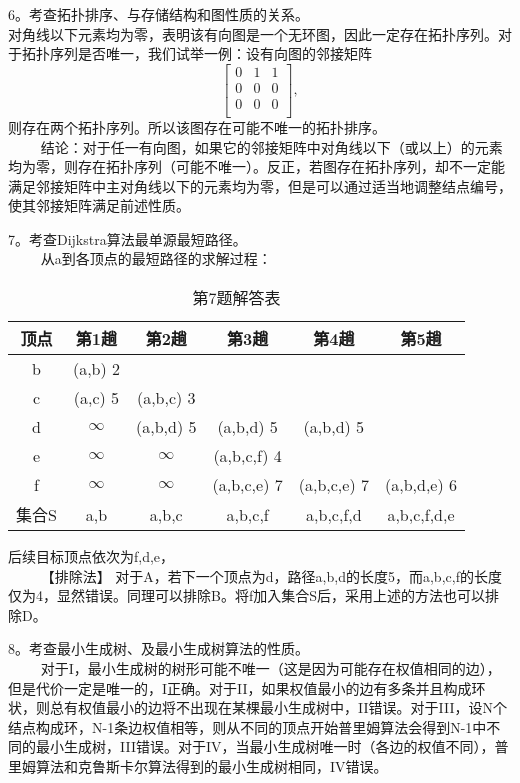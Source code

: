 6。考查拓扑排序、与存储结构和图性质的关系。\\
对角线以下元素均为零，表明该有向图是一个无环图，因此一定存在拓扑序列。对于拓扑序列是否唯一，我们试举一例：设有向图的邻接矩阵
\begin{equation}
\begin{bmatrix}
 0 & 1 & 1 \\
 0 & 0 & 0 \\
 0 & 0 & 0 \\
\end{bmatrix},
\end{equation}
则存在两个拓扑序列。所以该图存在可能不唯一的拓扑排序。\\
$\qquad$ 结论：对于任一有向图，如果它的邻接矩阵中对角线以下（或以上）的元素均为零，则存在拓扑序列（可能不唯一）。反正，若图存在拓扑序列，却不一定能满足邻接矩阵中主对角线以下的元素均为零，但是可以通过适当地调整结点编号，使其邻接矩阵满足前述性质。

7。考查Dijkstra算法最单源最短路径。\\
$\qquad$ 从a到各顶点的最短路径的求解过程：\\
\begin{table}[ht]
\centering
\caption{第7题解答表}\label{CSN12_tab5}
\begin{tabular}{|c|c|c|c|c|c|}
\hline
顶点 & 第1趟 & 第2趟 & 第3趟 & 第4趟 & 第5趟 \\
\hline
b & (a,b) 2 &  &  &  &  \\
\hline
c & (a,c) 5 & (a,b,c) 3 &  &  &  \\
\hline
d & $\infty$ & (a,b,d) 5 & (a,b,d) 5 & (a,b,d) 5 &  \\
\hline
e & $\infty$ & $\infty$ & (a,b,c,f) 4 &  &  \\
\hline
f & $\infty$  & $\infty$ & (a,b,c,e) 7 & (a,b,c,e) 7 & (a,b,d,e) 6 \\
\hline
集合S & {a,b} & {a,b,c} & {a,b,c,f} & {a,b,c,f,d} & {a,b,c,f,d,e} \\
\hline
\end{tabular}
\end{table}
后续目标顶点依次为f,d,e， \\
$\qquad$ 【排除法】 对于A，若下一个顶点为d，路径a,b,d的长度5，而a,b,c,f的长度仅为4，显然错误。同理可以排除B。将f加入集合S后，采用上述的方法也可以排除D。

8。考查最小生成树、及最小生成树算法的性质。\\
$\qquad$ 对于I，最小生成树的树形可能不唯一（这是因为可能存在权值相同的边），但是代价一定是唯一的，I正确。对于II，如果权值最小的边有多条并且构成环状，则总有权值最小的边将不出现在某棵最小生成树中，II错误。对于III，设N个结点构成环，N-1条边权值相等，则从不同的顶点开始普里姆算法会得到N-1中不同的最小生成树，III错误。对于IV，当最小生成树唯一时（各边的权值不同），普里姆算法和克鲁斯卡尔算法得到的最小生成树相同，IV错误。

